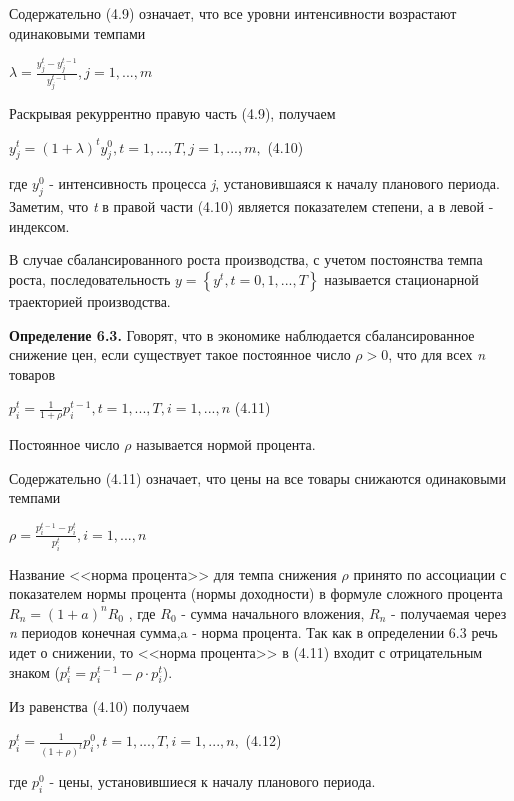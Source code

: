 \documentclass[12pt, 4paper]{book}
\begin{document}
{Содержательно (4.9) означает, что все уровни интенсивности возрастают одинаковыми темпами
\begin{center}
$\lambda = \frac{ y_{j}^t - y_{j}^{t-1}}{y_{j}^{t-1}},j=1,...,m$
\end{center}
Раскрывая рекуррентно правую часть (4.9), получаем
\begin{center}
$y_{j}^t=(1+\lambda)^t y_{j}^0, t=1,...,T, j=1,...,m,$ (4.10)
\end{center}
где $y_{j}^0$ - интенсивность процесса \textit{j}, установившаяся к началу планового периода. 
Заметим, что \textit{t} в правой части (4.10) является показателем степени, а в левой - индексом.
\par

В случае сбалансированного роста производства, с учетом постоянства темпа роста, последовательность $y = \left\{y^t, t=0,1,...,T \right\}$ называется стационарной траекторией производства.
\par

\textbf{Определение 6.3.} Говорят, что в экономике наблюдается сбалансированное снижение цен, если существует такое постоянное число $\rho > 0$, что для всех \textit{n} товаров 
\begin{center}
$p_{i}^{t}=\frac{1}{1+ \rho}p_{i}^{t-1}, t=1,...,T,i=1,...,n$ (4.11)
\end{center}
Постоянное число $\rho$ называется нормой процента.
\par

Содержательно (4.11) означает, что цены на все товары снижаются одинаковыми темпами
\begin{center}
$\rho = \frac{p_{i}^{t-1} - p_{i}^t}{p_{i}^t},i=1,...,n$
\end{center}
\par

Название <<норма процента>> для темпа снижения $\rho$ принято по ассоциации с показателем нормы процента (нормы доходности) в формуле сложного процента $R_{n}=(1+a)^n R_0$ , где $R_0$ - сумма начального вложения, $R_n$ - получаемая через \textit{n} периодов конечная сумма,a - норма процента. Так как в определении 6.3 речь идет о снижении, то <<норма процента>> в (4.11) входит с отрицательным знаком ($p_{i}^t=p_{i}^{t-1} - \rho \cdot p_{i}^t$).
\par

Из равенства (4.10) получаем
\begin{center}
$p_{i}^t = \frac{1}{(1+\rho)^t}p_{i}^0, t=1,...,T,i=1,...,n,$ (4.12)
\end{center}
где $p_{i}^0$ - цены, установившиеся к началу планового периода.
\par

}
\end{document}
